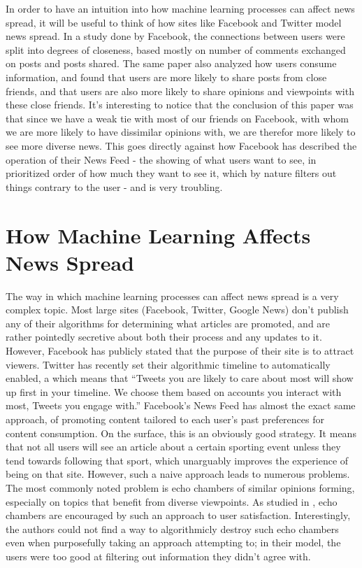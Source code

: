 \documentclass{article}
\begin{document}
In order to have an intuition into how machine learning processes can affect news spread, it will be useful to think of how sites like Facebook and Twitter model news spread. In a study done by Facebook, the connections between users were split into degrees of closeness, based mostly on number of comments exchanged on posts and posts shared. \cite{bakshy_rethinking_2012} The same paper also analyzed how users consume information, and found that users are more likely to share posts from close friends, and that users are also more likely to share opinions and viewpoints with these close friends. It's interesting to notice that the conclusion of this paper was that since we have a weak tie with most of our friends on Facebook, with whom we are more likely to have dissimilar opinions with, we are therefor more likely to see more diverse news. This goes directly against how Facebook has described the operation of their News Feed - the showing of what users want to see, in prioritized order of how much they want to see it, which by nature filters out things contrary to the user - and is very troubling. \cite{backstrom_facebook_2013} 

\section*{How Machine Learning Affects News Spread}
The way in which machine learning processes can affect news spread is a very complex topic. Most large sites (Facebook, Twitter, Google News) don't publish any of their algorithms for determining what articles are promoted, and are rather pointedly secretive about both their process and any updates to it. \cite{jeffries_twitter_2014,lecher_facebook_2016} However, Facebook has publicly stated that the purpose of their site is to attract viewers. \cite{shontell_mark_2014} Twitter has recently set their algorithmic timeline to automatically enabled, a which means that ``Tweets you are likely to care about most will show up first in your timeline. We choose them based on accounts you interact with most, Tweets you engage with.'' \cite{twitter_about_2016} Facebook's News Feed has almost the exact same approach, of promoting content tailored to each user's past preferences for content consumption. \cite{facebook_inc._10-k_2015} On the surface, this is an obviously good strategy. It means that not all users will see an article about a certain sporting event unless they tend towards following that sport, which unarguably improves the experience of being on that site. However, such a naive approach leads to numerous problems. The most commonly noted problem is echo chambers of similar opinions forming, especially on topics that benefit from diverse viewpoints. As studied in \citet{del_vicario_spreading_2016}, echo chambers are encouraged by such an approach to user satisfaction. Interestingly, the authors could not find a way to algorithmicly destroy such echo chambers even when purposefully taking an approach attempting to; in their model, the users were too good at filtering out information they didn't agree with. 
\end{document}
